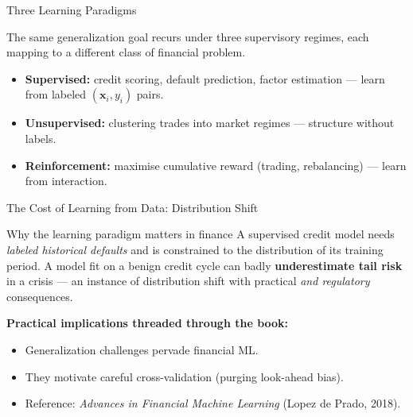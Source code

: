 \documentclass[9pt,t]{beamer}
\begin{document}
\begin{frame}{Three Learning Paradigms}

\begin{bigpicture}
The same generalization goal recurs under three supervisory regimes, each mapping
to a different class of financial problem.
\end{bigpicture}

\medskip
\begin{itemize}
  \item \textbf{Supervised:} credit scoring, default prediction, factor estimation
        --- learn from labeled $(\mathbf{x}_i, y_i)$ pairs.
  \item \textbf{Unsupervised:} clustering trades into market regimes --- structure
        without labels.
  \item \textbf{Reinforcement:} maximise cumulative reward (trading, rebalancing)
        --- learn from interaction.
\end{itemize}
\end{frame}

\begin{frame}{The Cost of Learning from Data: Distribution Shift}

\begin{alertblock}{Why the learning paradigm matters in finance}
A supervised credit model needs \emph{labeled historical defaults} and is
constrained to the distribution of its training period. A model fit on a benign
credit cycle can badly \textbf{underestimate tail risk} in a crisis --- an
instance of \alert{distribution shift} with practical \emph{and regulatory} consequences.
\end{alertblock}

\medskip
\textbf{Practical implications threaded through the book:}
\begin{itemize}
  \item Generalization challenges pervade financial ML.
  \item They motivate careful cross-validation (purging look-ahead bias).
  \item Reference: \emph{Advances in Financial Machine Learning}
        (Lopez de Prado, 2018).
\end{itemize}
\end{frame}
\end{document}
